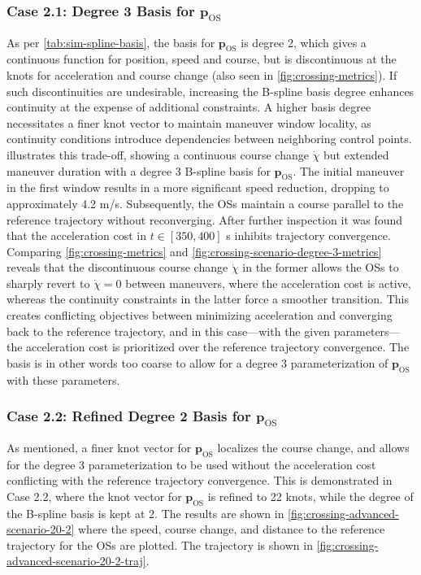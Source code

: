 \subsubsection{Case 2.1: Degree 3 Basis for $\mathbf p_\text{OS}$}
As per \cref{tab:sim-spline-basis}, the basis for $\mathbf p_\text{OS}$ is degree 2, which gives a continuous function for position, speed and course, but is discontinuous at the knots for acceleration and course change (also seen in \cref{fig:crossing-metrics}). 
If such discontinuities are undesirable, increasing the B-spline basis degree enhances continuity at the expense of additional constraints. A higher basis degree necessitates a finer knot vector to maintain maneuver window locality, as continuity conditions introduce dependencies between neighboring control points.  illustrates this trade-off, showing a continuous course change $\dot\chi$ but extended maneuver duration with a degree 3 B-spline basis for $\mathbf p_\text{OS}$. 
The initial maneuver in the first window results in a more significant speed reduction, dropping to approximately 4.2 m/s. Subsequently, the OSs maintain a course parallel to the reference trajectory without reconverging. After further inspection it was found that the acceleration cost in $t\in[350, 400]$ s inhibits trajectory convergence. 
Comparing \cref{fig:crossing-metrics} and \cref{fig:crossing-scenario-degree-3-metrics} reveals that the discontinuous course change $\dot{\chi}$ in the former allows the OSs to sharply revert to $\dot{\chi}=0$ between maneuvers, where the acceleration cost is active, whereas the continuity constraints in the latter force a smoother transition. This creates conflicting objectives between minimizing acceleration and converging back to the reference trajectory, and in this case---with the given parameters---the acceleration cost is prioritized over the reference trajectory convergence. The basis is in other words too coarse to allow for a degree 3 parameterization of $\mathbf p_\text{OS}$ with these parameters.

\subsubsection{Case 2.2: Refined Degree 2 Basis for $\mathbf p_\text{OS}$}\label{sec:case-2-2-refined-degree-2-basis}
As mentioned, a finer knot vector for $\mathbf p_\text{OS}$ localizes the course change, and allows for the degree 3 parameterization to be used without the acceleration cost conflicting with the reference trajectory convergence. This is demonstrated in Case 2.2, where the knot vector for $\mathbf p_\text{OS}$ is refined to 22 knots, while the degree of the B-spline basis is kept at 2. The results are shown in \cref{fig:crossing-advanced-scenario-20-2} where the speed, course change, and distance to the reference trajectory for the OSs are plotted. The trajectory is shown in \cref{fig:crossing-advanced-scenario-20-2-traj}. 

